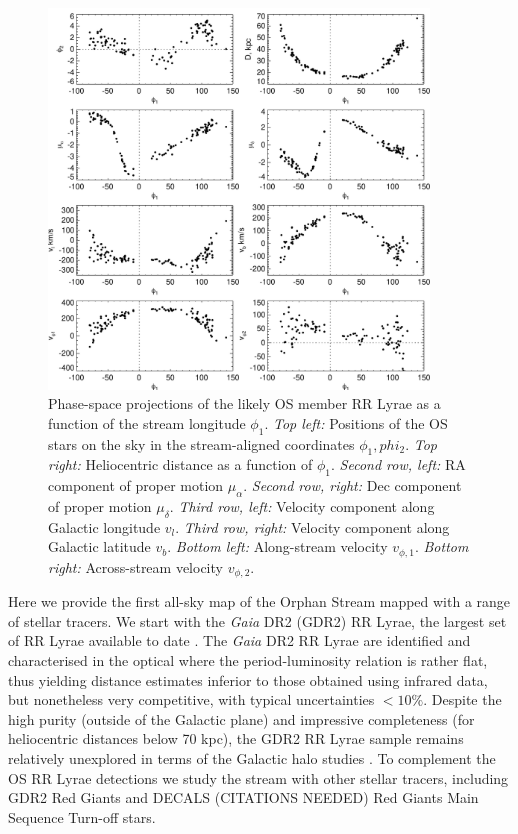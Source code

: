 \documentclass[a4paper,useAMS,usenatbib]{mnras}
\newcommand{\gaia}{\textit{Gaia} }
\begin{document}
%
\begin{figure}
  \centering
  \includegraphics[width=0.9\textwidth]{orphan_paper_phi1_members.pdf}
  \caption[]{Phase-space projections of the likely OS member RR Lyrae
    as a function of the stream longitude $\phi_1$. {\it Top left:}
    Positions of the OS stars on the sky in the stream-aligned
    coordinates $\phi_1, phi_2$. {\it Top right:} Heliocentric
    distance as a function of $\phi_1$. {\it Second row, left:} RA
    component of proper motion $\mu_{\alpha}$. {\it Second row,
      right:} Dec component of proper motion $\mu_{\delta}$. {\it
      Third row, left:} Velocity component along Galactic longitude
    $v_l$. {\it Third row, right:} Velocity component along Galactic
    latitude $v_b$. {\it Bottom left:} Along-stream velocity
    $v_{\phi,1}$. {\it Bottom right:} Across-stream velocity
    $v_{\phi,2}$.}
   \label{fig:memother}
\end{figure}
%

Here we provide the first all-sky map of the Orphan Stream mapped with
a range of stellar tracers. We start with the \gaia DR2 (GDR2) RR
Lyrae, the largest set of RR Lyrae available to date
\citep[see][]{Clementini2018,Holl2018}. The \gaia DR2 RR Lyrae are
identified and characterised in the optical where the
period-luminosity relation is rather flat, thus yielding distance
estimates inferior to those obtained using infrared data, but
nonetheless very competitive, with typical uncertainties
$<10\%$. Despite the high purity (outside of the Galactic plane) and
impressive completeness (for heliocentric distances below 70 kpc), the
GDR2 RR Lyrae sample remains relatively unexplored in terms of the
Galactic halo studies \citep[e.g.][]{Iorio2018, Torrealba2018}. To
complement the OS RR Lyrae detections we study the stream with other
stellar tracers, including GDR2 Red Giants and DECALS (CITATIONS
NEEDED) Red Giants Main Sequence Turn-off stars.
\end{document}
